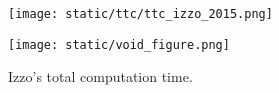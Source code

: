 \begin{figure}[H]
  \begin{minipage}{0.48\textwidth}
    \centering
    \texttt{[image: static/ttc/ttc\_izzo\_2015.png]}
    \caption{Izzo's total computation time.}\label{fig:ttc_izzo}
  \end{minipage}\hfill
  \begin{minipage}{0.48\textwidth}
    \centering
    \texttt{[image: static/void\_figure.png]}
  \end{minipage}
\end{figure}
